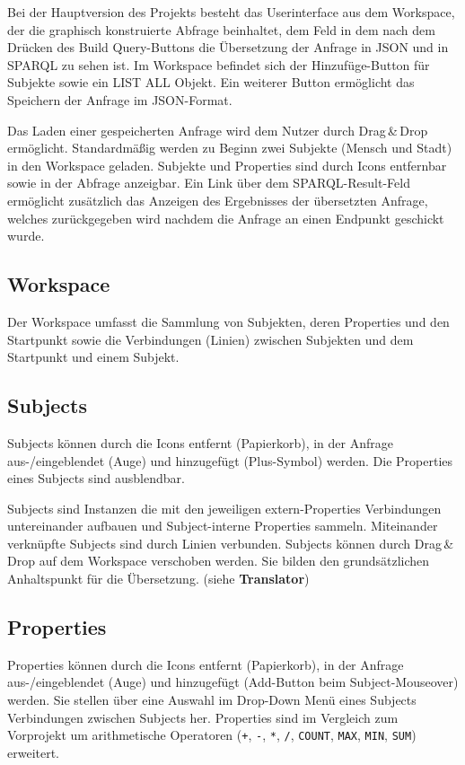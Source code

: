 Bei der Hauptversion des Projekts besteht das Userinterface aus dem
Workspace, der die graphisch konstruierte Abfrage beinhaltet, dem Feld
in dem nach dem Drücken des \glqq Build Query\grqq -Buttons die Übersetzung der
Anfrage in JSON und in SPARQL zu sehen ist.
Im Workspace befindet sich der Hinzufüge-Button für Subjekte sowie ein LIST ALL Objekt.
Ein weiterer Button ermöglicht das Speichern der Anfrage im
JSON-Format.

Das Laden einer gespeicherten Anfrage wird dem Nutzer durch
Drag\,\&\,Drop ermöglicht.
Standardmäßig werden zu Beginn zwei Subjekte (Mensch und Stadt) in den
Workspace geladen.
Subjekte und Properties sind durch Icons entfernbar sowie in der Abfrage anzeigbar.
Ein Link über dem SPARQL-Result-Feld ermöglicht zusätzlich das Anzeigen des Ergebnisses der übersetzten Anfrage, welches zurückgegeben wird nachdem die Anfrage an einen Endpunkt geschickt wurde.

\subsection*{Workspace}

Der Workspace umfasst die Sammlung von Subjekten, deren Properties und den Startpunkt sowie die Verbindungen (Linien) zwischen Subjekten und dem Startpunkt und einem Subjekt.

\subsection*{Subjects}

Subjects können durch die Icons entfernt (Papierkorb), in der Anfrage
aus-/eingeblendet (Auge) und hinzugefügt (Plus-Symbol) werden. Die
Properties eines Subjects sind ausblendbar.

Subjects sind Instanzen die mit den jeweiligen \glqq extern\grqq -Properties
Verbindungen untereinander aufbauen und Subject-interne Properties
sammeln. Miteinander verknüpfte Subjects sind durch Linien
verbunden. Subjects können durch Drag\,\&\,Drop auf dem Workspace
verschoben werden. Sie bilden den grundsätzlichen Anhaltspunkt für die
Übersetzung. (siehe {\sffamily\bfseries Translator})

\subsection*{Properties}

\Hack{\enlargethispage{1.5\baselineskip}}
Properties können durch die Icons entfernt (Papierkorb), in der Anfrage aus-/eingeblendet (Auge) und hinzugefügt (Add-Button beim Subject-Mouseover) werden.
Sie stellen über eine Auswahl im Drop-Down Menü eines Subjects Verbindungen zwischen Subjects her. Properties sind im Vergleich zum Vorprojekt um arithmetische Operatoren (\verb-+-, \verb+-+, \verb+*+, \verb+/+, \verb+COUNT+, \verb+MAX+, \verb+MIN+, \verb+SUM+) erweitert.

